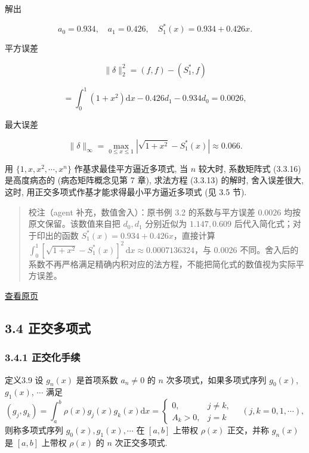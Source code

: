 \documentclass[
  10pt,
  fontset=fandol]{ctexart}
\begin{document}
解出

\[
a_0 = 0.934, \quad a_1 = 0.426, \quad S_1^*(x) = 0.934 + 0.426x.
\]

平方误差

\[
\|\delta\|_2^2 = (f, f) - (S_1^*, f)
\]

\[
= \int_0^1 (1+x^2) \mathrm{d}x - 0.426 d_1 - 0.934 d_0 = 0.0026,
\]

最大误差

\[
\|\delta\|_\infty = \max_{0 \leqslant x \leqslant 1} |\sqrt{1+x^2} - S_1^*(x)| \approx 0.066.
\]

用 \(\{1, x, x^2, \cdots, x^n\}\) 作基求最佳平方逼近多项式, 当 \(n\) 较大时, 系数矩阵式 (3.3.16) 是高度病态的 (病态矩阵概念见第 7 章), 求法方程 (3.3.13) 的解时, 舍入误差很大, 这时, 用正交多项式作基才能求得最小平方逼近多项式 (见 3.5 节).

\begin{quote}
校注（agent 补充，数值舍入）：原书例 3.2 的系数与平方误差 \(0.0026\) 均按原文保留。该数值来自把 \(d_0,d_1\) 分别近似为 \(1.147,0.609\) 后代入简化式；对于印出的函数 \(S_1^*(x)=0.934+0.426x\)，直接计算 \(\int_0^1[\sqrt{1+x^2}-S_1^*(x)]^2\,\mathrm{d}x\approx0.0007136324\)，与 \(0.0026\) 不同。舍入后的系数不再严格满足精确内积对应的法方程，不能把简化式的数值视为实际平方误差。
\end{quote}

\href{../../source-images/pdf-070.jpeg}{查看原页}

\subsection{3.4 正交多项式}\label{ux6b63ux4ea4ux591aux9879ux5f0f}

\subsubsection{3.4.1 正交化手续}\label{ux6b63ux4ea4ux5316ux624bux7eed}

定义3.9 设 \(g_n(x)\) 是首项系数 \(a_n \neq 0\) 的 \(n\) 次多项式，如果多项式序列 \(g_0(x)\), \(g_1(x)\), \(\cdots\) 满足 \[
(g_j, g_k) = \int_a^b \rho(x) g_j(x) g_k(x) \mathrm{d}x = \begin{cases} 0, & j \neq k, \\ A_k > 0, & j = k \end{cases} \quad (j, k = 0, 1, \cdots),
\] 则称多项式序列 \(g_0(x), g_1(x), \cdots\) 在 \([a, b]\) 上带权 \(\rho(x)\) 正交，并称 \(g_n(x)\) 是 \([a, b]\) 上带权 \(\rho(x)\) 的 \(n\) 次正交多项式.
\end{document}
